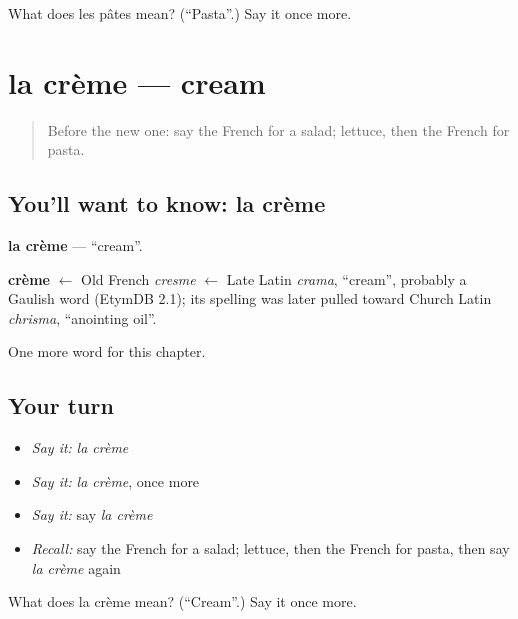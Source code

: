 \begin{tcolorbox}[breakable,colback=teal!4,colframe=teal!35!black,title={Before you move on}]
What does les pâtes mean? (\textquotedblleft{}Pasta\textquotedblright{}.) Say it once more.
\end{tcolorbox}
\section[la crème]{la crème — cream}

\label{lesson:FR-C72-creme}



\begin{quote}
Before the new one: say the French for a salad; lettuce, then the French for pasta.
\end{quote}

\subsection*{You'll want to know: la crème}
\textbf{la crème} — \textquotedblleft{}cream\textquotedblright{}.

\begin{cousinweb}
\textbf{crème} $\leftarrow$ Old French \emph{cresme} $\leftarrow$ Late Latin \emph{crama}, \textquotedblleft{}cream\textquotedblright{}, probably a Gaulish word (EtymDB 2.1); its spelling was later pulled toward Church Latin \emph{chrisma}, \textquotedblleft{}anointing oil\textquotedblright{}.
\end{cousinweb}

\begin{grammarlens}[title={What you've built}]
One more word for this chapter.
\end{grammarlens}

\subsection*{Your turn}
\begin{itemize}
\raggedright
  \item \emph{Say it:} \emph{la crème}
  \item \emph{Say it:} \emph{la crème}, once more
  \item \emph{Say it:} say \emph{la crème}
  \item \emph{Recall:} say the French for a salad; lettuce, then the French for pasta, then say \emph{la crème} again
\end{itemize}

\begin{tcolorbox}[breakable,colback=teal!4,colframe=teal!35!black,title={Before you move on}]
What does la crème mean? (\textquotedblleft{}Cream\textquotedblright{}.) Say it once more.
\end{tcolorbox}
